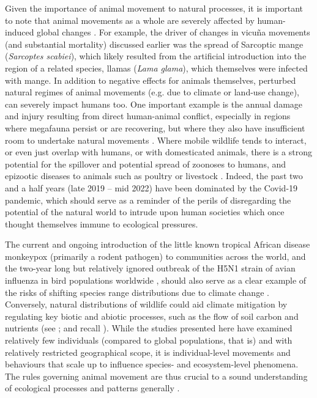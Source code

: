 Given the importance of animal movement to natural processes, it is important to note that animal movements as a whole are severely affected by human-induced global changes \parencite{tucker2018}.
For example, the driver of changes in vicu\~na movements (and substantial mortality) discussed earlier \parencite{monk2022} was the spread of Sarcoptic mange (\emph{Sarcoptes scabiei}), which likely resulted from the artificial introduction into the region of a related species, llamas (\emph{Lama glama}), which themselves were infected with mange.
In addition to negative effects for animals themselves, perturbed natural regimes of animal movements (e.g. due to climate or land-use change), can severely impact humans too.
One important example is the annual damage and injury resulting from direct human-animal conflict, especially in regions where megafauna persist or are recovering, but where they also have insufficient room to undertake natural movements \citep{abrahms2021}.
Where mobile wildlife tends to interact, or even just overlap with humans, or with domesticated animals, there is a strong potential for the spillover and potential spread of zoonoses to humans, and epizootic diseases to animals such as poultry or livestock \citep{carlson2022a,wille2022}.
Indeed, the past two and a half years (late 2019 -- mid 2022) have been dominated by the Covid-19 pandemic, which should serve as a reminder of the perils of disregarding the potential of the natural world to intrude upon human societies which once thought themselves immune to ecological pressures.

The current and ongoing introduction of the little known tropical African disease monkeypox (primarily a rodent pathogen) to communities across the world, and the two-year long but relatively ignored outbreak of the H5N1 strain of avian influenza in bird populations worldwide \parencite{wille2022}, should also serve as a clear example of the risks of shifting species range distributions due to climate change \parencite{carlson2022}.
Conversely, natural distributions of wildlife could aid climate mitigation by regulating key biotic and abiotic processes, such as the flow of soil carbon and nutrients (see \cite{schmitz2018,malhi2022}; and recall \cite{leroux2018}).
While the studies presented here have examined relatively few individuals (compared to global populations, that is) and with relatively restricted geographical scope, it is individual-level movements and behaviours that scale up to influence species- and ecosystem-level phenomena.
The rules governing animal movement are thus crucial to a sound understanding of ecological processes and patterns generally \citep{jeltsch2013,schlagel2020a,costa-pereira2022}.

